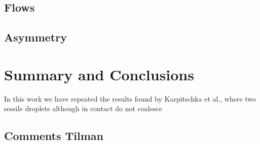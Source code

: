 \documentclass[twocolumn,amsmath,amssymb,showpacs,pre,nofootinbib,superscriptaddress]{revtex4-1} %
\begin{document}
\subsection{Flows}\label{subsec:flows}

\subsection{Asymmetry}\label{subsec:skewness}


\section{Summary and Conclusions}\label{sec:sum_conclu}
In this work we have repeated the results found by Karpitschka et al., where two sessile droplets although in contact do not coalesce~\cite{karpitschka2014sharp, doi:10.1021/la500459v}

\begin{acknowledgements}

\end{acknowledgements}
\subsection{Comments Tilman}
\end{document}
